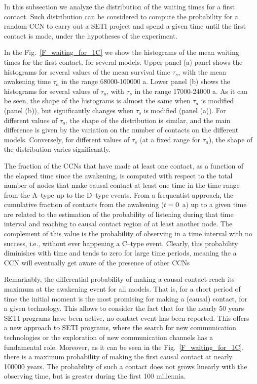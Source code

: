 \documentclass[crop]{CSLB}
\newcommand{\ceti}{CCN}
\newcommand{\cetis}{CCNs}
\newcommand{\ffn}[1]{}
\begin{document}
In this subsection we analyze the distribution of the waiting times for
a first contact.
%
Such distribution can be considered to compute the probability for a
random \ceti{} to carry out a SETI project and spend a given time until
the first contact is made, under the hypotheses of the experiment.
%
\ffn{6}
%
In the Fig.~\ref{F_waiting_for_1C} we show the histograms of the mean
waiting times for the first contact, for several models.
%
Upper panel (a) panel shows the histograms for several values of the
mean survival time $\tau_s$, with the mean awakening time $\tau_a$ in
the range 68000-100000 a.
%
Lower panel (b) shows the histograms for several values of $\tau_a$,
with $\tau_s$ in the range 17000-24000 a.
%
As it can be seen, the shape of the histograms is almost the same when
$\tau_a$ is modified (panel (b)), but significantly changes when
$\tau_s$ is modified (panel (a)). 
%
For different values of $\tau_a$, the shape of the distribution is
similar, and the main difference is given by the variation on the number of
contacts on the different models.
%
Conversely, for different values of $\tau_s$ (at a fixed range for
$\tau_a$), the shape of the
distribution varies significantly.

 

The fraction of the \cetis{} that have made at least one contact, as a
function of the elapsed time since the awakening, is computed with
respect to the total number of nodes that make causal contact at least
one time in the time range from the A--type up to the D--type
events.
%
From a frequentist approach, the cumulative fraction of contacts
from the awakening
($t=$0~a) up to a given time are related to the estimation of the
probability of listening during that time interval and reaching to
causal contact region of at least another node.
%
The complement of this value is the probability of observing in a time
interval with no success, i.e., without ever happening a C--type
event.
%
Clearly, this probability diminishes with time and tends to zero for
large time periods, meaning the a \ceti{} will eventually get aware of
the presence of other \cetis{}


Remarkably, the differential probability of making a causal contact reach its
maximum at the awakening event for all models.
%
That is, for a short period of time the initial moment is the most promising
for making a (causal) contact, for a given technology.
%
This allows to consider the fact that for the nearly 50 years SETI
programs have been active, no contact event has been reported.
%
This offers a new approach to SETI programs, where the
search for new communication technologies or the exploration of
new communication channels has a fundamental role.
%
Moreover, as it can be seen in the Fig.~\ref{F_waiting_for_1C}, there
is a maximum probability of making the first causal contact at nearly
100000 years.
%
The probability of such a contact does not grows linearly
with the observing time, but is greater during the first 100
millennia.
\end{document}
